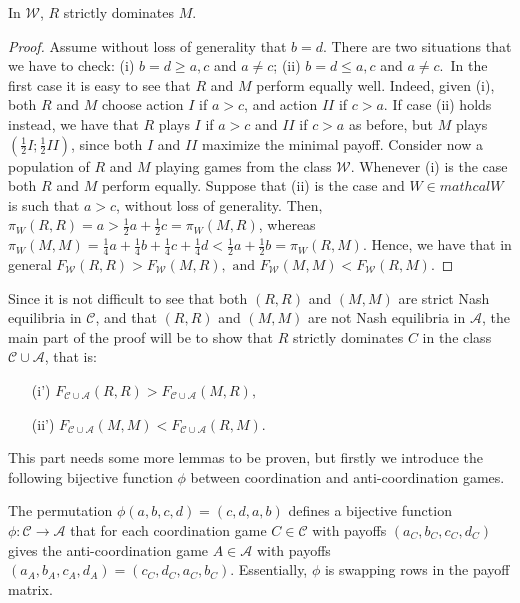 \documentclass[fleqn,reqno,11pt]{article}
\begin{document}
\begin{lemma} \label{lemma:W games} In $\mathcal{W}$, $R$ strictly dominates $M$.
\end{lemma}

\begin{proof}
  Assume without loss of generality that $b=d$. There are two situations that we have to check:
  (i) $b=d \geq a,c$ and $ a \neq c $; (ii) $b=d \leq a,c$ and $ a \neq c $.\ In the first case it is easy to see that $R$ and $M$
  perform equally well. Indeed, given (i), both $R$ and $M$ choose action $I$ if $a>c$, and
  action $II$ if $c>a$. If case (ii) holds instead, we have that $R$ plays $I$ if $a>c$ and
  $II$ if $c>a$ as before, but $M$ plays $(\frac{1}{2}I;\frac{1}{2}II)$, since both $I$ and
  $II$ maximize the minimal payoff. Consider now a population of $R$ and $M$ playing games from
  the class $\mathcal{W}$.  Whenever (i) is the case both $R$ and $M$ perform equally. Suppose
  that (ii) is the case and $W \in mathcal{W}$ is such that $a>c$, without loss of generality. Then,
  $\pi_W(R,R)=a>\frac{1}{2}a+\frac{1}{2}c=\pi_W(M,R)$, whereas
  $\pi_W(M,M)=\frac{1}{4}a+\frac{1}{4}b+\frac{1}{4}c+\frac{1}{4}d<\frac{1}{2}a+\frac{1}{2}b=\pi_W(R,M)$.
  Hence, we have that in general
  $F_{\mathcal{W}}(R,R)>F_{\mathcal{W}}(M,R),\mbox{ and
  }F_{\mathcal{W}}(M,M)<F_{\mathcal{W}}(R,M)$.
\end{proof}

Since it is not difficult to see that both $(R,R)$ and $(M,M)$ are strict Nash equilibria in
$\mathcal{C}$, and that $(R,R)$ and $(M,M)$ are not Nash equilibria in $\mathcal{A}$, the main
part of the proof will be to show that $R$ strictly dominates $C$ in the class
$\mathcal{C}\cup\mathcal{A}$, that is:
\begin{multicols}{2}
  \begin{itemize}
  \item[(i')] $F_{\mathcal{C}\cup\mathcal{A}}(R,R)>F_{\mathcal{C}\cup\mathcal{A}}(M,R),$
  \item[(ii')] $F_{\mathcal{C}\cup\mathcal{A}}(M,M)<F_{\mathcal{C}\cup\mathcal{A}}(R,M).$
  \end{itemize}
\end{multicols}

\noindent This part needs some more lemmas to be proven, but firstly we introduce
the following bijective function $\phi$ between coordination and
anti-coordination games.

\begin{definition}[$\phi$] \label{def:bijection phi} The permutation $\phi(a,b,c,d)=(c,d,a,b)$
  defines a bijective function $\phi:\mathcal{C}\rightarrow\mathcal{A}$ that for each
  coordination game $C\in\mathcal{C}$ with payoffs $(a_{C},b_{C},c_{C},d_{C})$ gives the
  anti-coordination game $A\in\mathcal{A}$ with payoffs
  $(a_{A},b_{A},c_{A},d_{A})=(c_{C},d_{C},a_{C},b_{C})$. Essentially, $\phi$ is swapping rows
  in the payoff matrix.
\end{definition}
\end{document}
